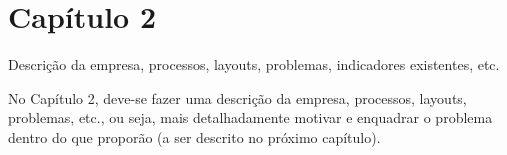 \chapter{Capítulo 2}

Descrição da empresa, processos, layouts, problemas, indicadores existentes, etc.

No Capítulo 2, deve-se fazer uma descrição da empresa, processos, layouts, problemas, etc., ou seja, mais detalhadamente motivar e enquadrar o problema dentro do que proporão (a ser descrito no próximo capítulo).
